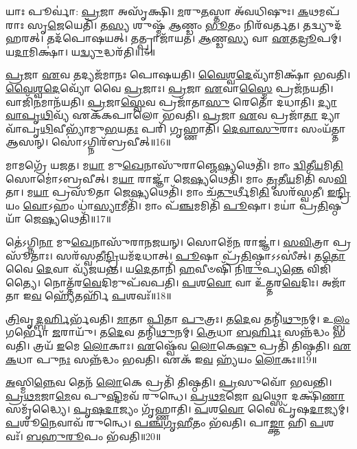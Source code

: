 𑌯𑌾𑌃 𑌪𑍂𑌰𑍍𑌵𑌾॑: \ul{𑌪𑍍𑌰}\-𑌜𑌾 𑌅𑌸𑍃᳴𑌕𑍍𑌷𑌿।
\-\ul{𑌮}\-𑌰𑍁\-\ul{𑌤}\-𑌸𑍍𑌤𑌾 𑌅᳴𑌵𑌧𑌿𑌷𑍁𑌃।
\-\ul{𑌕}\-𑌥𑌮𑌪᳴𑌰𑌾𑌃 𑌸𑍃\-\ul{𑌜𑍇}\-𑌯𑍇𑌤𑌿᳴।
𑌤\-\ul{𑌸𑍍𑌯} 𑌶𑍁𑌷𑍍𑌮᳴ \ul{𑌆}\-𑌣𑍍𑌡𑌂 \ul{𑌭𑍂}\-𑌤𑌂 𑌨𑌿𑌰᳴𑌵𑌰𑍍𑌤𑌤।
𑌤𑌦𑍍𑌵𑍍𑌯𑍁𑌦᳴𑌹𑌰𑌤𑍍।
𑌤𑌦᳴𑌪𑍋𑌷𑌯𑌤𑍍।
𑌤𑌤𑍍𑌪𑍍𑌰𑌾𑌜𑌾᳴𑌯𑌤।
\-\ul{𑌆}\-𑌣𑍍𑌡\-\ul{𑌸𑍍𑌯} 𑌵𑌾 \ul{𑌏}\-𑌤\-\ul{𑌦𑍍𑌰𑍂}\-𑌪𑌮𑍍।
𑌯\-\ul{𑌦𑌾}\-𑌮𑌿𑌕𑍍𑌷𑌾॑।
𑌯\-\ul{𑌦𑍍𑌵𑍍𑌯𑍁}\-𑌦𑍍𑌧𑌰᳴𑌤𑌿॥15॥

\-\ul{𑌪𑍍𑌰}\-𑌜𑌾 \ul{𑌏}\-𑌵 𑌤𑌦𑍍𑌯𑌜᳴𑌮𑌾𑌨𑌃 𑌪𑍋𑌷𑌯𑌤𑌿।
\-\ul{𑌵𑍈}\-\-\ul{𑌶𑍍𑌵}\-\-\ul{𑌦𑍇}\-𑌵𑍍𑌯𑌾᳴𑌮𑌿𑌕𑍍𑌷𑌾᳴ 𑌭𑌵𑌤𑌿।
\-\ul{𑌵𑍈}\-\-\ul{𑌶𑍍𑌵}\-\-\ul{𑌦𑍇}\-𑌵𑍍𑌯𑍋᳴ 𑌵𑍈 \ul{𑌪𑍍𑌰}\-𑌜𑌾𑌃।
\-\ul{𑌪𑍍𑌰}\-𑌜𑌾 \ul{𑌏}\-𑌵𑌾\-\ul{𑌸𑍍𑌮𑍈} 𑌪𑍍𑌰𑌜᳴𑌨𑌯𑌤𑌿।
𑌵𑌾𑌜𑌿᳴\-\ul{𑌨}\-𑌮𑌾𑌨᳴𑌯𑌤𑌿।
\-\ul{𑌪𑍍𑌰}\-𑌜𑌾\-\ul{𑌸𑍍𑌵𑍇}\-𑌵 𑌪𑍍𑌰𑌜𑌾᳴𑌤𑌾\-\ul{𑌸𑍁} 𑌰𑍇𑌤𑍋᳴ 𑌦𑌧𑌾𑌤𑌿।
\-\ul{𑌦𑍍𑌯𑌾}\-\-\ul{𑌵𑌾}\-\-\ul{𑌪𑍃}\-\-\ul{𑌥𑌿}\-𑌵𑍍𑌯᳴ 𑌏𑌕᳴𑌕𑌪𑌾𑌲𑍋 𑌭𑌵𑌤𑌿।
\-\ul{𑌪𑍍𑌰}\-𑌜𑌾 \ul{𑌏}\-𑌵 𑌪𑍍𑌰𑌜𑌾᳴\-\ul{𑌤𑌾} 𑌦𑍍𑌯𑌾𑌵𑌾᳴𑌪𑍃\-\ul{𑌥𑌿}\-𑌵𑍀𑌭𑍍𑌯𑌾᳴𑌮𑍁\-\ul{𑌭}\-𑌯\-\ul{𑌤𑌃} 𑌪𑌰𑌿᳴ 𑌗𑍃𑌹𑍍𑌣𑌾𑌤𑌿।
\-\ul{𑌦𑍇}\-\-\ul{𑌵𑌾}\-\-\ul{𑌸𑍁}\-𑌰𑌾𑌃 𑌸𑌂𑌯᳴𑌤𑍍𑌤𑌾 𑌆𑌸𑌨𑍍।
𑌸𑍋॑𑌽𑌗𑍍𑌨𑌿𑌰᳴𑌬𑍍𑌰𑌵𑍀𑌤𑍍॥16॥

𑌮𑌾𑌮𑌗𑍍𑌰𑍇᳴ 𑌯𑌜𑌤।
𑌮\-\ul{𑌯𑌾} 𑌮𑍁\-\ul{𑌖𑍇}\-𑌨𑌾𑌸𑍁᳴𑌰𑌾𑌞𑍍𑌜𑍇\-\ul{𑌷𑍍𑌯}\-𑌥𑍇𑌤𑌿᳴।
𑌮𑌾𑌂 \ul{𑌦𑍍𑌵𑌿}\-𑌤𑍀\-\ul{𑌯}\-𑌮𑌿\-\ul{𑌤𑌿} 𑌸𑍋𑌮𑍋॑\-𑌽𑌬𑍍𑌰𑌵𑍀𑌤𑍍।
𑌮\-\ul{𑌯𑌾} 𑌰𑌾𑌜𑍍𑌞𑌾᳴ 𑌜𑍇\-\ul{𑌷𑍍𑌯}\-𑌥𑍇𑌤𑌿᳴।
𑌮𑌾𑌂 \ul{𑌤𑍃}\-𑌤𑍀\-\ul{𑌯}\-𑌮𑌿𑌤𑌿᳴ 𑌸\-\ul{𑌵𑌿}\-𑌤𑌾।
𑌮\-\ul{𑌯𑌾} 𑌪𑍍𑌰𑌸𑍂᳴𑌤𑌾 𑌜𑍇\-\ul{𑌷𑍍𑌯}\-𑌥𑍇𑌤𑌿᳴।
𑌮𑌾𑌂 𑌚᳴\-\ul{𑌤𑍁}\-𑌰𑍍𑌥𑍀𑌮𑌿\-\ul{𑌤𑌿} 𑌸𑌰᳴𑌸𑍍𑌵𑌤𑍀।
\-\ul{𑌇}\-\-\ul{𑌨𑍍𑌦𑍍𑌰𑌿}\-𑌯𑌂 \ul{𑌵𑍋}\-𑌽𑌹𑌂 𑌧𑌾॑\-\ul{𑌸𑍍𑌯𑌾}\-𑌮𑍀𑌤𑌿᳴।
𑌮𑌾𑌂 𑌪᳴\-\ul{𑌞𑍍𑌚}\-𑌮𑌮𑌿𑌤𑌿᳴ \ul{𑌪𑍂}\-𑌷𑌾।
𑌮𑌯𑌾॑ 𑌪𑍍𑌰\-\ul{𑌤𑌿}\-𑌷𑍍𑌠𑌯𑌾᳴ 𑌜𑍇\-\ul{𑌷𑍍𑌯}\-𑌥𑍇𑌤𑌿᳴॥17॥

𑌤𑍇॑𑌽𑌗𑍍𑌨𑌿\-\ul{𑌨𑌾} 𑌮𑍁\-\ul{𑌖𑍇}\-𑌨𑌾𑌸𑍁᳴𑌰𑌾𑌨𑌜𑌯𑌨𑍍।
𑌸𑍋𑌮𑍇᳴\-\ul{𑌨} 𑌰𑌾𑌜𑍍𑌞𑌾॑।
\-\ul{𑌸}\-\-\ul{𑌵𑌿}\-𑌤𑍍𑌰𑌾 𑌪𑍍𑌰𑌸𑍂᳴𑌤𑌾𑌃।
𑌸𑌰᳴𑌸𑍍𑌵𑌤𑍀\-\ul{𑌨𑍍𑌦𑍍𑌰𑌿}\-𑌯𑌮᳴𑌦𑌧𑌾𑌤𑍍।
\-\ul{𑌪𑍂}\-𑌷𑌾 𑌪𑍍𑌰᳴\-\ul{𑌤𑌿}\-𑌷𑍍𑌠𑌾\-𑌽𑌽𑌸𑍀॑𑌤𑍍।
𑌤\-\ul{𑌤𑍋} 𑌵𑍈 \ul{𑌦𑍇}\-𑌵𑌾 𑌵𑍍𑌯᳴𑌜𑌯𑌨𑍍𑌤।
𑌯\-\ul{𑌦𑍇}\-𑌤𑌾𑌨𑌿᳴ \ul{𑌹}\-𑌵𑍀𑍞𑌷𑌿᳴ 𑌨𑌿\-\ul{𑌰𑍁}\-𑌪𑍍𑌯\-\ul{𑌨𑍍𑌤𑍇} 𑌵𑌿𑌜𑌿᳴𑌤𑍍𑌯𑍈।
𑌨𑍋𑌤𑍍𑌤᳴𑌰\-\ul{𑌵𑍇}\-𑌦𑌿𑌮𑍁𑌪᳴𑌵𑌪𑌤𑌿।
\-\ul{𑌪}\-𑌶\-\ul{𑌵𑍋} 𑌵𑌾 𑌉᳴𑌤𑍍𑌤𑌰\-\ul{𑌵𑍇}\-𑌦𑌿𑌃।
𑌅𑌜𑌾᳴𑌤𑌾 𑌇\-\ul{𑌵} 𑌹𑍍𑌯𑍇᳴𑌤𑌰𑍍\mbox{}𑌹𑌿᳴ \ul{𑌪}\-𑌶𑌵𑌃᳴॥18॥\anuvakamend[\-\ul{𑌐}\-𑌦𑌿𑌤𑍍𑌯᳴𑌶𑍋𑌚\-\ul{𑌦𑍍𑌵𑍍𑌯𑍁}\-𑌦𑍍𑌧𑌰᳴𑌤𑍍𑌯𑌬𑍍𑌰𑌵𑍀𑌤𑍍𑌪𑍍𑌰\-\ul{𑌤𑌿}\-𑌷𑍍𑌠𑌯𑌾᳴ 𑌜𑍇\-\ul{𑌷𑍍𑌯}\-𑌥𑍇\-\ul{𑌤𑍍𑌯𑍇}\-𑌤𑌰𑍍\mbox{}𑌹𑌿᳴ \ul{𑌪}\-𑌶𑌵𑌃᳴]

\-\ul{𑌤𑍍𑌰𑌿}\-𑌵𑍃\-\ul{𑌦𑍍𑌬}\-\-\ul{𑌰𑍍}\-𑌹𑌿𑌰𑍍𑌭᳴𑌵𑌤𑌿।
\-\ul{𑌮𑌾}\-𑌤𑌾 \ul{𑌪𑌿}\-𑌤𑌾 \ul{𑌪𑍁}\-𑌤𑍍𑌰𑌃।
𑌤\-\ul{𑌦𑍇}\-𑌵 𑌤𑌨𑍍𑌮𑌿᳴\-\ul{𑌥𑍁}\-𑌨𑌮𑍍।
𑌉\-\ul{𑌲𑍍𑌬𑌂} 𑌗𑌰𑍍𑌭𑍋᳴ \ul{𑌜}\-𑌰𑌾𑌯𑍁᳴।
𑌤\-\ul{𑌦𑍇}\-𑌵 𑌤𑌨𑍍𑌮𑌿᳴\-\ul{𑌥𑍁}\-𑌨𑌮𑍍।
\-\ul{𑌤𑍍𑌰𑍇}\-𑌧𑌾 \ul{𑌬}\-\-\ul{𑌰𑍍}\-𑌹𑌿𑌃 𑌸𑌨𑍍𑌨᳴𑌦𑍍𑌧𑌂 𑌭𑌵𑌤𑌿।
𑌤𑍍𑌰𑌯᳴ \ul{𑌇}\-𑌮𑍇 \ul{𑌲𑍋}\-𑌕𑌾𑌃।
\-\ul{𑌏}\-𑌷𑍍𑌵𑍇᳴𑌵 \ul{𑌲𑍋}\-𑌕𑍇\-\ul{𑌷𑍁} 𑌪𑍍𑌰𑌤𑌿᳴ 𑌤𑌿𑌷𑍍𑌠𑌤𑌿।
\-\ul{𑌏}\-\-\ul{𑌕}\-𑌧𑌾 𑌪𑍁\-\ul{𑌨𑌃} 𑌸𑌨𑍍𑌨᳴𑌦𑍍𑌧𑌂 𑌭𑌵𑌤𑌿।
𑌏𑌕᳴ 𑌇\-\ul{𑌵} 𑌹𑍍𑌯᳴𑌯𑌂 \ul{𑌲𑍋}\-𑌕𑌃॥19॥

\-\ul{𑌅}\-𑌸𑍍𑌮𑌿\-\ul{𑌨𑍍𑌨𑍇}\-𑌵 𑌤𑍇𑌨᳴ \ul{𑌲𑍋}\-𑌕𑍇 𑌪𑍍𑌰𑌤𑌿᳴ 𑌤𑌿𑌷𑍍𑌠𑌤𑌿।
\-\ul{𑌪𑍍𑌰}\-𑌸𑍁𑌵𑍋᳴ 𑌭𑌵𑌨𑍍𑌤𑌿।
\-\ul{𑌪𑍍𑌰}\-\-\ul{𑌥}\-\-\ul{𑌮}\-𑌜𑌾\-\ul{𑌮𑍇}\-𑌵 𑌪𑍁\-\ul{𑌷𑍍𑌟𑌿}\-𑌮𑌵᳴ 𑌰𑍁𑌨𑍍𑌧𑍇।
\-\ul{𑌪𑍍𑌰}\-\-\ul{𑌥}\-\-\ul{𑌮}\-𑌜𑍋 \ul{𑌵}\-𑌥𑍍𑌸𑍋 𑌦𑌕𑍍𑌷𑌿᳴\-\ul{𑌣𑌾} 𑌸𑌮𑍃᳴𑌦𑍍𑌧𑍍𑌯𑍈।
\-\ul{𑌪𑍃}\-\-\ul{𑌷}\-\-\ul{𑌦𑌾}\-𑌜𑍍𑌯𑌂 𑌗𑍃᳴𑌹𑍍𑌣𑌾𑌤𑌿।
\-\ul{𑌪}\-𑌶\-\ul{𑌵𑍋} 𑌵𑍈 𑌪𑍃᳴𑌷\-\ul{𑌦𑌾}\-𑌜𑍍𑌯𑌮𑍍।
\-\ul{𑌪}\-𑌶𑍂\-\ul{𑌨𑍇}\-𑌵𑌾𑌵᳴ 𑌰𑍁𑌨𑍍𑌧𑍇।
\-\ul{𑌪}\-\-\ul{𑌞𑍍𑌚}\-\-\ul{𑌗𑍃}\-\-\ul{𑌹𑍀}\-𑌤𑌂 𑌭᳴𑌵𑌤𑌿।
𑌪𑌾\-\ul{𑌙𑍍𑌕𑍍𑌤𑌾} 𑌹𑌿 \ul{𑌪}\-𑌶𑌵𑌃᳴।
\-\ul{𑌬}\-\-\ul{𑌹𑍁}\-\-\ul{𑌰𑍂}\-𑌪𑌂 𑌭᳴𑌵𑌤𑌿॥20॥

